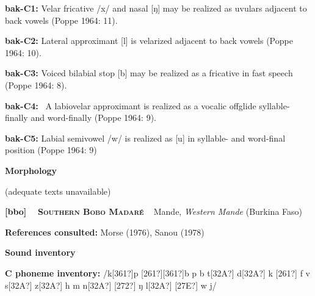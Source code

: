 \begin{styleBody}
\textbf{bak-C1:} Velar fricative /x/ and nasal [ŋ] may be realized as uvulars adjacent to back vowels (Poppe 1964: 11).
\end{styleBody}

\begin{styleBody}
\textbf{bak-C2: }Lateral approximant [l] is velarized adjacent to back vowels (Poppe 1964: 10).
\end{styleBody}

\begin{styleBody}
\textbf{bak-C3: }Voiced bilabial stop [b] may be realized as a fricative in fast speech (Poppe 1964: 8).
\end{styleBody}

\begin{styleBody}
\textbf{bak-C4: }\ A labiovelar approximant is realized as a vocalic offglide syllable-finally and word-finally (Poppe 1964: 9).
\end{styleBody}

\begin{styleBody}
\textbf{bak-C5: }Labial semivowel /w/ is realized as [u] in syllable- and word-final position (Poppe 1964: 9)
\end{styleBody}

\begin{styleBody}
\textbf{Morphology}
\end{styleBody}

\begin{styleBody}
(adequate texts unavailable)
\end{styleBody}

\clearpage\begin{styleBody}
\textbf{[bbo] }\ \ \textbf{\textsc{Southern Bobo Madaré}}\textbf{\ \ }Mande, \textit{Western Mande} (Burkina Faso)
\end{styleBody}

\begin{styleBody}
\textbf{References consulted: }Morse (1976), Sanou (1978)
\end{styleBody}

\begin{styleBody}
\textbf{Sound inventory}
\end{styleBody}

\begin{styleBody}
\textbf{C phoneme inventory:} /k[361?]p [261?][361?]b p b t[32A?] d[32A?] k [261?] f v s[32A?] z[32A?] h m n[32A?] [272?] ŋ l[32A?] [27E?] w j/
\end{styleBody}

